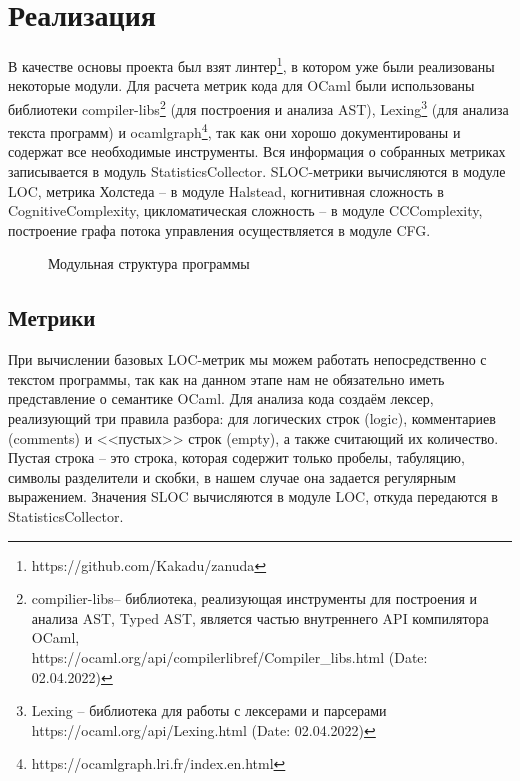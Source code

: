 \section{Реализация}
В качестве основы проекта был взят линтер\footnote{https://github.com/Kakadu/zanuda}, в котором
уже были реализованы некоторые модули. Для расчета метрик кода для OCaml были использованы
библиотеки compiler-libs\footnote{compilier-libs-- библиотека, реализующая инструменты для построения и анализа AST, Typed AST,  является частью внутреннего API компилятора OCaml,\\
https://ocaml.org/api/compilerlibref/Compiler\_libs.html (Date: 02.04.2022)} (для построения и анализа AST), Lexing\footnote{Lexing -- библиотека для работы с лексерами и парсерами\\ https://ocaml.org/api/Lexing.html (Date: 02.04.2022)} (для анализа текста программ) и ocamlgraph\footnote{https://ocamlgraph.lri.fr/index.en.html}, так как они хорошо документированы и содержат все
необходимые инструменты. Вся информация о собранных метриках записывается в модуль StatisticsCollector. SLOC-метрики вычисляются в модуле LOC, метрика Холстеда 
-- в модуле Halstead, когнитивная сложность в CognitiveComplexity, цикломатическая сложность -- в модуле CCComplexity, построение
графа потока управления осуществляется в модуле CFG.
\begin{figure}[h]
    \caption{Модульная структура программы}
\end{figure}

\subsection{Метрики}
При вычислении базовых LOC-метрик мы можем работать непосредственно с текстом программы,
так как на данном этапе нам не обязательно иметь представление о семантике OCaml. Для анализа кода создаём лексер, реализующий три правила разбора: для логических строк (logic), комментариев (comments) и <<пустых>> строк (empty), а также считающий их количество. Пустая строка -- это строка, которая содержит только пробелы, табуляцию, символы разделители и скобки, в нашем случае она задается регулярным выражением.
Значения SLOC вычисляются в модуле LOC, откуда передаются в StatisticsCollector.

